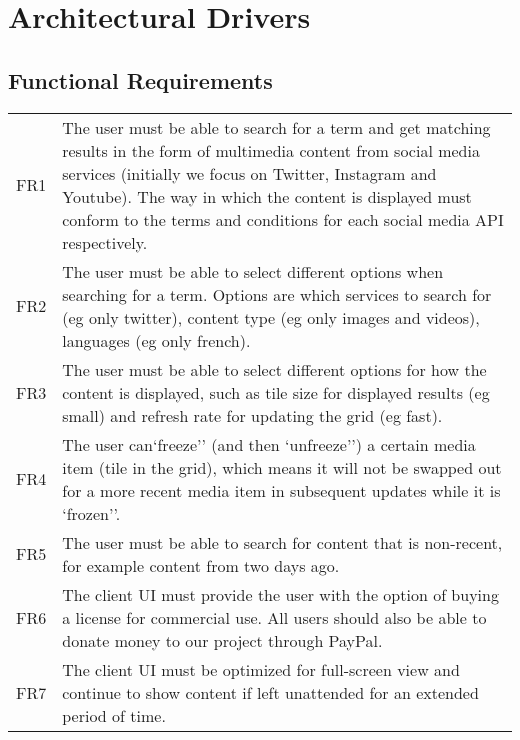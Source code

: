 \label{ad}
\chapter{Architectural Drivers}

\section{Functional Requirements}
{\tabulinesep=1.4mm
\begin{tabu}{|l|l|}
\hline
{}
 \\
\hline
\taburowcolors{}
FR1 & \parbox[t]{105mm}{The user must be able to search for a term and get
   matching results in the form of multimedia content from social media services
   (initially we focus on Twitter, Instagram and Youtube). The way in which the
   content is displayed must conform to the terms and conditions for each social
   media API respectively.} \\
\hline
FR2 & \parbox[t]{105mm}{The user must be able to select different options when
   searching for a term. Options are which services to search for (eg only
   twitter), content type (eg only images and videos), languages (eg only
   french).} \\
\hline
FR3 & \parbox[t]{105mm}{The user must be able to select different options for
   how the content is displayed, such as tile size for displayed results
   (eg small) and refresh rate for updating the grid (eg fast).} \\
\hline
FR4 & \parbox[t]{105mm}{The user can`freeze'' (and then `unfreeze'') a certain
   media item (tile in the grid), which means it will not be swapped out for a
   more recent media item in subsequent updates while it is `frozen''.} \\
\hline
FR5 & \parbox[t]{105mm}{The user must be able to search for content that is
   non-recent, for example content from two days ago.} \\
\hline
FR6 & \parbox[t]{105mm}{The client UI must provide the user with the option of
   buying a license for commercial use. All users should also be able to donate
   money to our project through PayPal.} \\
\hline
FR7 & \parbox[t]{105mm}{The client UI must be optimized for full-screen view and
   continue to show content if left unattended for an extended period of
   time.} \\
\hline
\end{tabu}}

